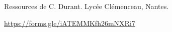Ressources de C. Durant. Lycée Clémenceau, Nantes.
\begin{center}
\end{center}

\url{https://forms.gle/iATEMMKfh26mNXRi7}
